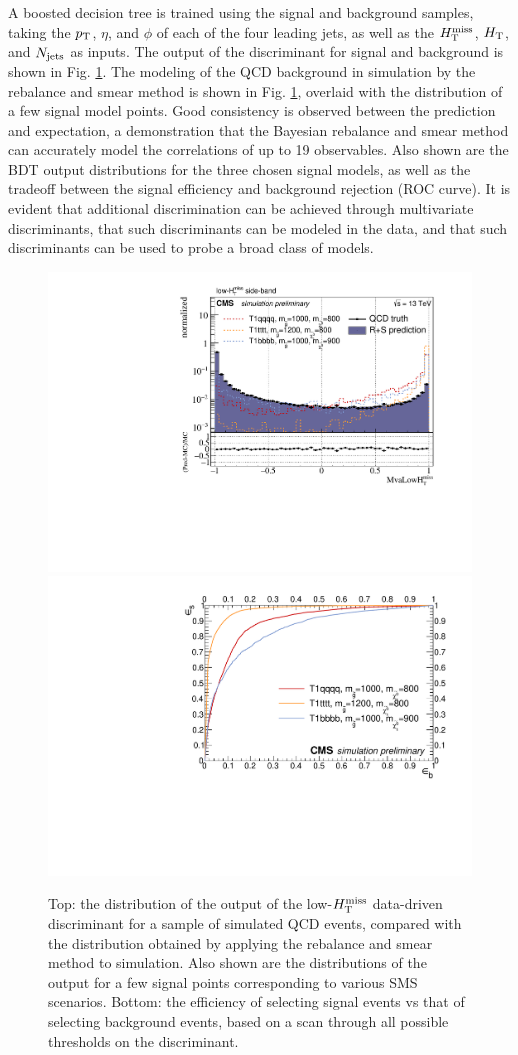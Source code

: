 A boosted decision tree is trained using the signal and background samples, taking the $p_{\text{T}}$, $\eta$, and $\phi$ of each of the four leading jets, as well as the $H_{\text{T}}^{\rm miss}$, $H_{\rm T}$, and $N_{\rm jets}$ as inputs. The output of the discriminant for signal and background is shown in Fig. \ref{fig:SusyBdt}. The modeling of the QCD background in simulation by the rebalance and smear method is shown in Fig. \ref{fig:SusyBdt}, overlaid with the distribution of a few signal model points. Good consistency is observed between the prediction and expectation, a demonstration that the Bayesian rebalance and smear method can accurately model the correlations of up to 19 observables. Also shown are the BDT output distributions for the three chosen signal models, as well as the tradeoff between the signal efficiency and background rejection (ROC curve). It is evident that additional discrimination can be achieved through multivariate discriminants, that such discriminants can be modeled in the data, and that such discriminants can be used to probe a broad class of models.
\begin{figure}[h]
\centering
\includegraphics[width=0.7\linewidth]{figures/SusySearches/MvaLowMht.pdf}
\includegraphics[width=0.7\linewidth]{figures/SusySearches/RocCurvesLowMht_QCDVsSUSY.pdf}
\caption{Top: the distribution of the output of the low-$H_{\text{T}}^{\rm miss}$ data-driven discriminant for a sample of simulated QCD events, compared with the distribution obtained by applying the rebalance and smear method to simulation. Also shown are the distributions of the output for a few signal points corresponding to various SMS scenarios. Bottom: the efficiency of selecting signal events vs that of selecting background events, based on a scan through all possible thresholds on the discriminant.}
\label{fig:SusyBdt}
\end{figure}

